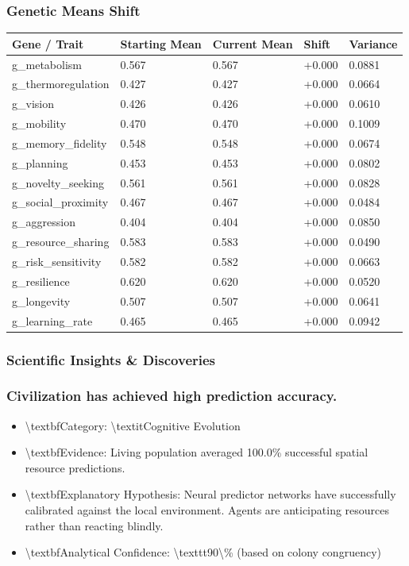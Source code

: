 \documentclass[11pt,a4paper]{article}
\begin{document}
\subsubsection*{ Genetic Means Shift}
\begin{longtable}{lllll}
\toprule
Gene / Trait & Starting Mean & Current Mean & Shift & Variance \\
\midrule
\endhead
g\_metabolism & 0.567 & 0.567 & +0.000 & 0.0881 \\
g\_thermoregulation & 0.427 & 0.427 & +0.000 & 0.0664 \\
g\_vision & 0.426 & 0.426 & +0.000 & 0.0610 \\
g\_mobility & 0.470 & 0.470 & +0.000 & 0.1009 \\
g\_memory\_fidelity & 0.548 & 0.548 & +0.000 & 0.0674 \\
g\_planning & 0.453 & 0.453 & +0.000 & 0.0802 \\
g\_novelty\_seeking & 0.561 & 0.561 & +0.000 & 0.0828 \\
g\_social\_proximity & 0.467 & 0.467 & +0.000 & 0.0484 \\
g\_aggression & 0.404 & 0.404 & +0.000 & 0.0850 \\
g\_resource\_sharing & 0.583 & 0.583 & +0.000 & 0.0490 \\
g\_risk\_sensitivity & 0.582 & 0.582 & +0.000 & 0.0663 \\
g\_resilience & 0.620 & 0.620 & +0.000 & 0.0520 \\
g\_longevity & 0.507 & 0.507 & +0.000 & 0.0641 \\
g\_learning\_rate & 0.465 & 0.465 & +0.000 & 0.0942 \\
\bottomrule
\end{longtable}

\subsubsection*{ Scientific Insights \& Discoveries}
\subsubsection*{ Civilization has achieved high prediction accuracy.}
\begin{itemize}
  \item \textbackslash{}textbf{Category:} \textbackslash{}textit{Cognitive Evolution}
  \item \textbackslash{}textbf{Evidence:} Living population averaged 100.0\% successful spatial resource predictions.
  \item \textbackslash{}textbf{Explanatory Hypothesis:} Neural predictor networks have successfully calibrated against the local environment. Agents are anticipating resources rather than reacting blindly.
  \item \textbackslash{}textbf{Analytical Confidence:} \textbackslash{}texttt{90\textbackslash{}\%} (based on colony congruency)
\end{itemize}
\end{document}
